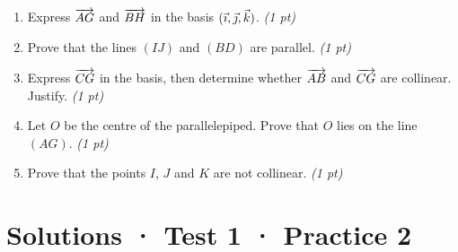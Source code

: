 \begin{enumerate}

\item Express $\overrightarrow{AG}$ and $\overrightarrow{BH}$ in the basis $(\vec{\imath},\vec{\jmath},\vec k)$. \hfill\textit{(1 pt)}

\item Prove that the lines $(IJ)$ and $(BD)$ are parallel. \hfill\textit{(1 pt)}

\item Express $\overrightarrow{CG}$ in the basis, then determine whether $\overrightarrow{AB}$ and $\overrightarrow{CG}$ are collinear. Justify. \hfill\textit{(1 pt)}

\item Let $O$ be the centre of the parallelepiped. Prove that $O$ lies on the line $(AG)$. \hfill\textit{(1 pt)}

\item Prove that the points $I$, $J$ and $K$ are not collinear. \hfill\textit{(1 pt)}

\end{enumerate}

\ifprof\clearpage

\section*{Solutions · Test 1 · Practice 2}\label{cor:1-2}

